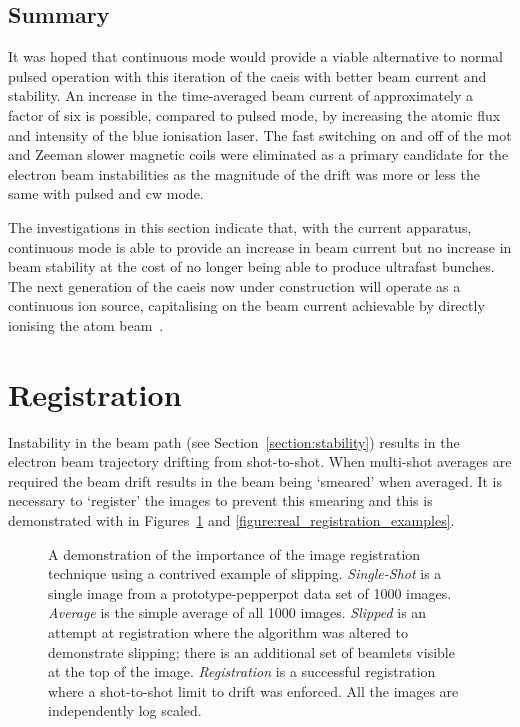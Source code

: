 \subsection{Summary}

It was hoped that continuous mode would provide a viable alternative to normal pulsed operation with this iteration of the \gls{caeis} with better beam current and stability.
An increase in the time-averaged beam current of approximately a factor of six is possible, compared to pulsed mode, by increasing the atomic flux and intensity of the blue ionisation laser.
The fast switching on and off of the \gls{mot} and Zeeman slower magnetic coils were eliminated as a primary candidate for the electron beam instabilities as the magnitude of the drift was more or less the same with pulsed and \gls{cw} mode.

The investigations in this section indicate that, with the current apparatus, continuous mode is able to provide an increase in beam current but no increase in beam stability at the cost of no longer being able to produce ultrafast bunches.
The next generation of the \gls{caeis} now under construction will operate as a continuous ion source, capitalising on the beam current achievable by directly ionising the atom beam~\cite{mcculloch_heralded_2018}.

\section{Registration}\label{section:registration}

Instability in the beam path (see Section~\ref{section:stability}) results in the electron beam trajectory drifting from shot-to-shot.
When multi-shot averages are required the beam drift results in the beam being `smeared' when averaged.
It is necessary to `register' the images to prevent this smearing and this is demonstrated with in Figures~\ref{figure:registration_examples} and \ref{figure:real_registration_examples}.

\begin{figure}
    \center
    
    \caption[Contrived image registration example.]{A demonstration of the importance of the image registration technique using a contrived example of slipping. \emph{Single-Shot} is a single image from a prototype-pepperpot data set of 1000 images. \emph{Average} is the simple average of all 1000 images. \emph{Slipped} is an attempt at registration where the algorithm was altered to demonstrate slipping; there is an additional set of beamlets visible at the top of the image. \emph{Registration} is a successful registration where a shot-to-shot limit to drift was enforced. All the images are independently log scaled.}
    \label{figure:registration_examples}
\end{figure}

